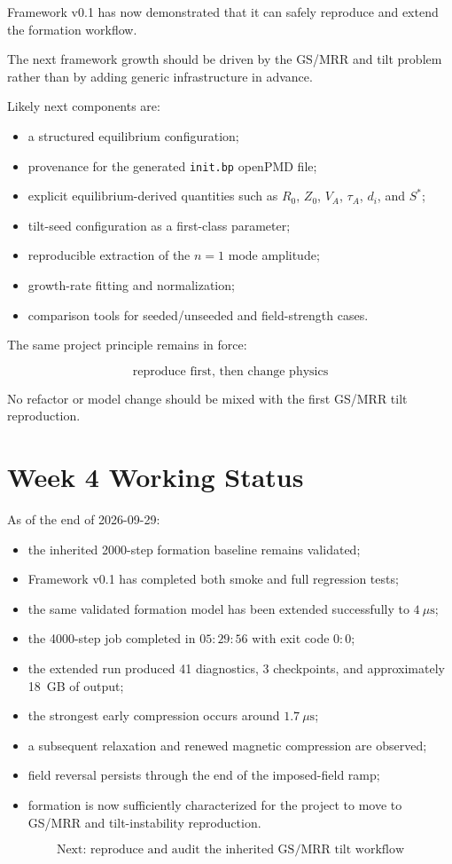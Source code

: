 \documentclass[11pt,a4paper]{article}
\begin{document}
Framework v0.1 has now demonstrated that it can safely reproduce and extend the
formation workflow.

The next framework growth should be driven by the GS/MRR and tilt problem
rather than by adding generic infrastructure in advance.

Likely next components are:

\begin{itemize}
    \item a structured equilibrium configuration;
    \item provenance for the generated \texttt{init.bp} openPMD file;
    \item explicit equilibrium-derived quantities such as
    \(R_0\), \(Z_0\), \(V_A\), \(\tau_A\), \(d_i\), and \(S^*\);
    \item tilt-seed configuration as a first-class parameter;
    \item reproducible extraction of the \(n=1\) mode amplitude;
    \item growth-rate fitting and normalization;
    \item comparison tools for seeded/unseeded and field-strength cases.
\end{itemize}

The same project principle remains in force:

\[
\boxed{
\text{reproduce first, then change physics}
}
\]

No refactor or model change should be mixed with the first GS/MRR tilt
reproduction.

\section{Week 4 Working Status}

As of the end of 2026-09-29:

\begin{itemize}
    \item the inherited 2000-step formation baseline remains validated;
    \item Framework v0.1 has completed both smoke and full regression tests;
    \item the same validated formation model has been extended successfully to
    \(4~\mu\mathrm{s}\);
    \item the 4000-step job completed in \(05{:}29{:}56\) with exit code
    \(0{:}0\);
    \item the extended run produced 41 diagnostics, 3 checkpoints, and
    approximately 18~GB of output;
    \item the strongest early compression occurs around
    \(1.7~\mu\mathrm{s}\);
    \item a subsequent relaxation and renewed magnetic compression are observed;
    \item field reversal persists through the end of the imposed-field ramp;
    \item formation is now sufficiently characterized for the project to move
    to GS/MRR and tilt-instability reproduction.
\end{itemize}

\[
\boxed{
\text{Next: reproduce and audit the inherited GS/MRR tilt workflow}
}
\]
\end{document}
